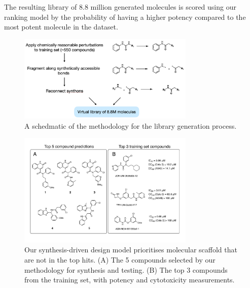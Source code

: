 The resulting library of 8.8 million generated molecules is scored using our ranking model by the probability of having a higher potency compared to the most potent molecule in the dataset.
\begin{figure}
    \centering
        \includegraphics[width=0.75\textwidth]{Chapters/Ranking/Figs/library.png}
        \caption{A schedmatic of the methodology for the library generation process.}
        \label{fig:library}
\end{figure}

\begin{figure}
    \centering
        \includegraphics[width=0.75\textwidth]{Chapters/Ranking/Figs/fig2.pdf}
        \caption{Our synthesis-driven design model prioritises molecular scaffold that are not in the top hits. (A) The 5 compounds selected by our methodology for synthesis and testing. (B) The top 3 compounds from the training set, with potency and cytotoxicity measurements.}
        \label{fig:compounds}
\end{figure}

